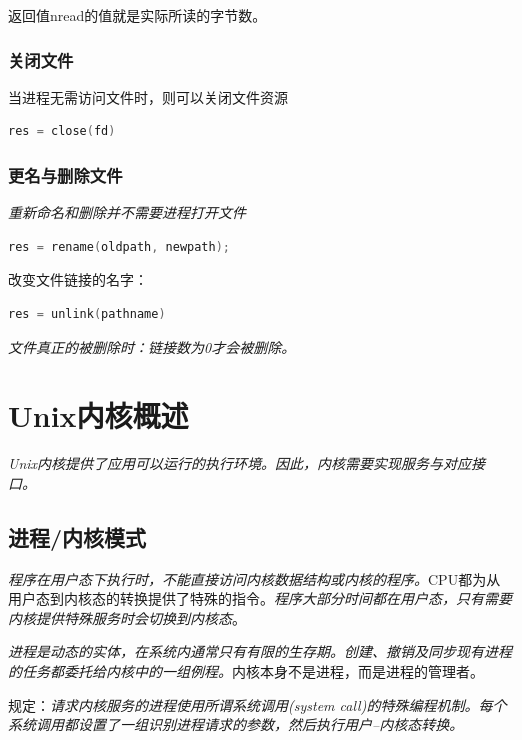     返回值nread的值就是实际所读的字节数。

\subsubsection{关闭文件}

    当进程无需访问文件时，则可以关闭文件资源

\begin{lstlisting}[language=C++]
res = close(fd)
\end{lstlisting}

\subsubsection{更名与删除文件}

    \emph{重新命名和删除并不需要进程打开文件}

\begin{lstlisting}[language=C++]
res = rename(oldpath, newpath);
\end{lstlisting}

    改变文件链接的名字：

\begin{lstlisting}[language=C++]
res = unlink(pathname)
\end{lstlisting}

    \emph{文件真正的被删除时：链接数为0才会被删除。}

\section{Unix内核概述}

    \emph{Unix内核提供了应用可以运行的执行环境。因此，内核需要实现服务与对应接口。}

\subsection{进程/内核模式}

    \emph{程序在用户态下执行时，不能直接访问内核数据结构或内核的程序。}CPU都为从用户态到内核态的转换提供了特殊的指令。\emph{程序大部分时间都在用户态，只有需要内核提供特殊服务时会切换到内核态}。

    \emph{进程是动态的实体，在系统内通常只有有限的生存期。创建、撤销及同步现有进程的任务都委托给内核中的一组例程。}内核本身不是进程，而是进程的管理者。

    规定：\emph{请求内核服务的进程使用所谓系统调用(system call)的特殊编程机制。每个系统调用都设置了一组识别进程请求的参数，然后执行用户--内核态转换。}

